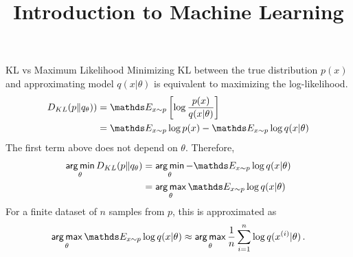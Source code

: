 



\newcommand{\titlefigure}{figure_man/multinoulli.png}
\newcommand{\learninggoals}{
  \item \textcolor{blue}{XXX}
  \item \textcolor{blue}{XXX}
}

\title{Introduction to Machine Learning}
\date{}






\begin{vbframe}{KL vs Maximum Likelihood}
Minimizing KL between the true distribution $p(x)$ and approximating model $q(x|\theta)$ is equivalent to maximizing the log-likelihood.
  \begin{align*}
    D_{KL}(p \| q_\theta)) &= \E_{x \sim p} \left[ \log \frac{p(x)}{q(x|\theta)}\right] \\
     &= \E_{x \sim p} \log p(x) - \E_{x \sim p} \log q(x|\theta)
  \end{align*}
  The first term above does not depend on $\theta$. Therefore,
  \begin{align*}
    \argmin_{\theta} D_{KL}(p \| q_\theta) &= \argmin_{\theta} -\E_{x \sim p} \log q(x|\theta)\\ 
                                           &= \argmax_{\theta} \E_{x \sim p} \log q(x|\theta)
  \end{align*}
  For a finite dataset of $n$ samples from $p$, this is approximated as 
  $$\argmax_{\theta} \E_{x \sim p} \log q(x|\theta) \approx \argmax_{\theta} \frac{1}{n} \sumin \log q(\xi|\theta)\,.$$

\end{vbframe}

